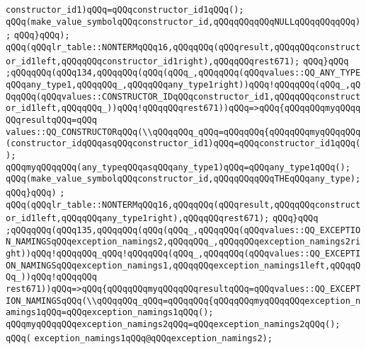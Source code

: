 \verb|constructor_id1)qQQq=qQQqconstructor_id1qQQq();|\newline
\verb|qQQq(make_value_symbolqQQqconstructor_id,qQQqqQQqqQQqNULLqQQqqQQqqQQq);|\newline
\verb|qQQq}qQQq);|\newline
\verb|qQQq(qQQqlr_table::NONTERMqQQq16,qQQqqQQq(qQQqresult,qQQqqQQqconstructor_id1left,qQQqqQQqconstructor_id1right),qQQqqQQqrest671);|\newline
\verb|qQQq}qQQq|\newline
\verb|;qQQqqQQq(qQQq134,qQQqqQQq(qQQq(qQQq_,qQQqqQQq(qQQqvalues::QQ_ANY_TYPEqQQqany_type1,qQQqqQQq_,qQQqqQQqany_type1right))qQQq!qQQqqQQq(qQQq_,qQQqqQQq(qQQqvalues::CONSTRUCTOR_IDqQQqconstructor_id1,qQQqqQQqconstructor_id1left,qQQqqQQq_))qQQq!qQQqqQQqrest671))qQQq=>qQQq{qQQqqQQqmyqQQqqQQqresultqQQq=qQQq|\newline
\verb|values::QQ_CONSTRUCTORqQQq(\\qQQqqQQq_qQQq=qQQqqQQq{qQQqqQQqmyqQQqqQQq(constructor_idqQQqasqQQqconstructor_id1)qQQq=qQQqconstructor_id1qQQq();|\newline
\verb|qQQqmyqQQqqQQq(any_typeqQQqasqQQqany_type1)qQQq=qQQqany_type1qQQq();|\newline
\verb|qQQq(make_value_symbolqQQqconstructor_id,qQQqqQQqqQQqTHEqQQqany_type);|\newline
\verb|qQQq}qQQq)|\newline
\verb|;|\newline
\verb|qQQq(qQQqlr_table::NONTERMqQQq16,qQQqqQQq(qQQqresult,qQQqqQQqconstructor_id1left,qQQqqQQqany_type1right),qQQqqQQqrest671);|\newline
\verb|qQQq}qQQq|\newline
\verb|;qQQqqQQq(qQQq135,qQQqqQQq(qQQq(qQQq_,qQQqqQQq(qQQqvalues::QQ_EXCEPTION_NAMINGSqQQqexception_namings2,qQQqqQQq_,qQQqqQQqexception_namings2right))qQQq!qQQqqQQq_qQQq!qQQqqQQq(qQQq_,qQQqqQQq(qQQqvalues::QQ_EXCEPTION_NAMINGSqQQqexception_namings1,qQQqqQQqexception_namings1left,qQQqqQQq_))qQQq!qQQqqQQq|\newline
\verb|rest671))qQQq=>qQQq{qQQqqQQqmyqQQqqQQqresultqQQq=qQQqvalues::QQ_EXCEPTION_NAMINGSqQQq(\\qQQqqQQq_qQQq=qQQqqQQq{qQQqqQQqmyqQQqqQQqexception_namings1qQQq=qQQqexception_namings1qQQq();|\newline
\verb|qQQqmyqQQqqQQqexception_namings2qQQq=qQQqexception_namings2qQQq();|\newline
\verb|qQQq(|\newline
\verb|exception_namings1qQQq@qQQqexception_namings2);|\newline
